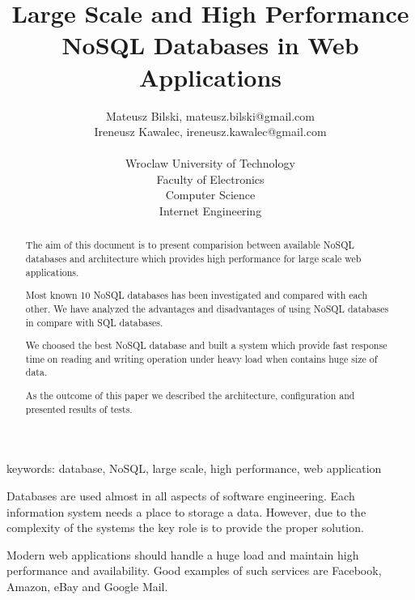 \documentclass[times, 10pt,twocolumn]{article}
\begin{document}
  

\title{ Large Scale and High Performance NoSQL Databases in Web Applications}
\author{Mateusz Bilski, mateusz.bilski@gmail.com \\ Ireneusz Kawalec, ireneusz.kawalec@gmail.com \\ \\
Wroclaw University of Technology\\ Faculty of Electronics \\ Computer Science \\ Internet Engineering  \\  
} 

\maketitle
\thispagestyle{empty} 

\begin{abstract}  

The aim of this document is to present comparision between available NoSQL databases and architecture which
provides high performance for large scale web applications.

Most known 10 NoSQL databases has been investigated and compared with each other. We have analyzed the advantages 
and disadvantages of using NoSQL databases in compare with SQL databases. 

We choosed the best NoSQL database and built a system which provide fast response time on reading and writing operation
under heavy load when contains huge size of data.

As the outcome of this paper we described the architecture, configuration and presented results of tests.

\end{abstract} 

keywords: database, NoSQL, large scale, high performance, web application


Databases are used almost in all aspects of software engineering. Each 
information system needs a place to storage a data. However, due to the complexity of the systems 
the key role is to provide the proper solution.

Modern web applications should handle a huge load and maintain high performance and
availability. Good examples of such services are Facebook, Amazon, eBay and Google Mail.
\end{document}
